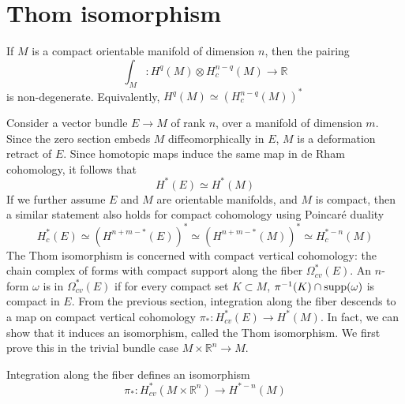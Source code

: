 \section{Thom isomorphism}
\begin{thm} 
	\label{thm:poincare_duality}
	If $M$ is a compact orientable manifold of dimension $n$, then the pairing 
	\[
	\int_M : H^q(M)\otimes H_c^{n-q}(M) \to \mathbb{R}
	\] 
	is non-degenerate. Equivalently, $H^q(M)\simeq (H^{n-q}_c(M))^*$
\end{thm}
Consider a vector bundle $E\to M$ of rank  $n$, over a manifold of dimension $m$. 
Since the zero section embeds
$M$ diffeomorphically in  $E$, $M$ is a deformation retract of  $E$. Since
homotopic maps induce the same map in de Rham cohomology, it follows that
\[
H^*(E) \simeq H^*(M)
\] 
If we further assume $E$ and  $M$ are orientable manifolds, and $M$ is
compact, then a similar statement also holds for compact cohomology using 
Poincar\'e duality %
\[
H^*_c(E) \simeq (H^{n+m-*}(E))^* \simeq (H^{n+m-*}(M))^* \simeq H^{*-n}_c(M)
\] 
The Thom isomorphism is concerned with compact vertical cohomology: the chain
complex of forms with compact support along the fiber $\Omega_{cv}^*(E)$. An
$n$-form  $\omega$ is in $\Omega_{cv}^*(E)$ if for every compact set $K \subset M$, 
$\pi^{-1}(K)\cap \operatorname{supp}(\omega)$ is compact in $E$. 
From the previous section, integration along the fiber descends to a map 
on compact vertical cohomology
$\pi_* : H_{cv}^*(E) \to H^*(M)$. In fact, we can show that it induces an
isomorphism, called the Thom isomorphism.
We first prove this in the trivial bundle case $M\times \mathbb{R}^n \to M$.
\begin{prop} %
	Integration along the fiber defines an isomorphism
	\[
	\pi_* : H_{cv}^*(M\times \mathbb{R}^n) \to H^{*-n}(M)
	\] 
\end{prop}
